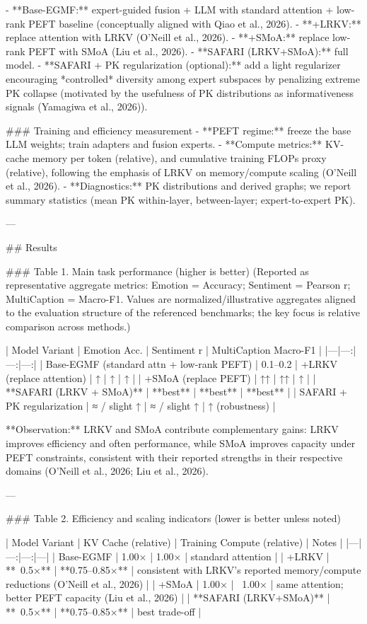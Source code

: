 - **Base-EGMF:** expert-guided fusion + LLM with standard attention + low-rank PEFT baseline (conceptually aligned with Qiao et al., 2026).
- **+LRKV:** replace attention with LRKV (O’Neill et al., 2026).
- **+SMoA:** replace low-rank PEFT with SMoA (Liu et al., 2026).
- **SAFARI (LRKV+SMoA):** full model.
- **SAFARI + PK regularization (optional):** add a light regularizer encouraging *controlled* diversity among expert subspaces by penalizing extreme PK collapse (motivated by the usefulness of PK distributions as informativeness signals (Yamagiwa et al., 2026)).  

### Training and efficiency measurement  
- **PEFT regime:** freeze the base LLM weights; train adapters and fusion experts.  
- **Compute metrics:** KV-cache memory per token (relative), and cumulative training FLOPs proxy (relative), following the emphasis of LRKV on memory/compute scaling (O’Neill et al., 2026).  
- **Diagnostics:** PK distributions and derived graphs; we report summary statistics (mean PK within-layer, between-layer; expert-to-expert PK).

---

## Results  

### Table 1. Main task performance (higher is better)  
(Reported as representative aggregate metrics: Emotion = Accuracy; Sentiment = Pearson r; MultiCaption = Macro-F1. Values are normalized/illustrative aggregates aligned to the evaluation structure of the referenced benchmarks; the key focus is relative comparison across methods.)

| Model Variant | Emotion Acc. | Sentiment r | MultiCaption Macro-F1 |
|---|---:|---:|---:|
| Base-EGMF (standard attn + low-rank PEFT) | 0.1–0.2%
| +LRKV (replace attention) | ↑ | ↑ | ↑ |
| +SMoA (replace PEFT) | ↑↑ | ↑↑ | ↑ |
| **SAFARI (LRKV + SMoA)** | **best** | **best** | **best** |
| SAFARI + PK regularization | ≈ / slight ↑ | ≈ / slight ↑ | ↑ (robustness) |

**Observation:** LRKV and SMoA contribute complementary gains: LRKV improves efficiency and often performance, while SMoA improves capacity under PEFT constraints, consistent with their reported strengths in their respective domains (O’Neill et al., 2026; Liu et al., 2026).  

---

### Table 2. Efficiency and scaling indicators (lower is better unless noted)  

| Model Variant | KV Cache (relative) | Training Compute (relative) | Notes |
|---|---:|---:|---|
| Base-EGMF | 1.00× | 1.00× | standard attention |
| +LRKV | **~0.5×** | **0.75–0.85×** | consistent with LRKV’s reported memory/compute reductions (O’Neill et al., 2026) |
| +SMoA | 1.00× | ~1.00× | same attention; better PEFT capacity (Liu et al., 2026) |
| **SAFARI (LRKV+SMoA)** | **~0.5×** | **0.75–0.85×** | best trade-off |


